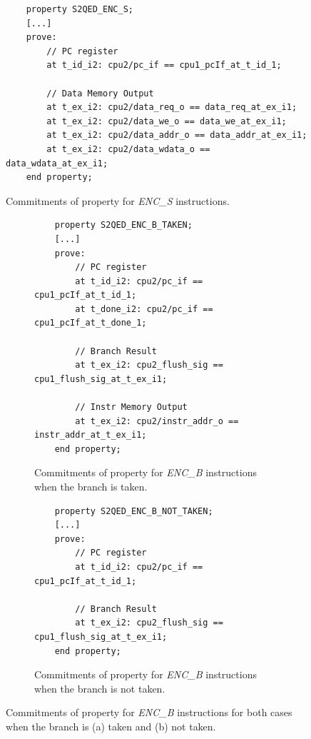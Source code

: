 \begin{figure}[htb!]
    \begin{lstlisting}
    property S2QED_ENC_S;
    [...]
    prove:
        // PC register
        at t_id_i2: cpu2/pc_if == cpu1_pcIf_at_t_id_1;
        
        // Data Memory Output
        at t_ex_i2: cpu2/data_req_o == data_req_at_ex_i1;
        at t_ex_i2: cpu2/data_we_o == data_we_at_ex_i1;
        at t_ex_i2: cpu2/data_addr_o == data_addr_at_ex_i1;
        at t_ex_i2: cpu2/data_wdata_o == data_wdata_at_ex_i1;
    end property;\end{lstlisting}
    \caption{Commitments of \SSQED{} property for \textit{ENC\_S} instructions.}
    \label{fig:ri5cy-enc-s-s2qed-ppt}
\end{figure}

\begin{figure}[htb!]
     \centering
     \begin{subfigure}[b]{\textwidth}
         \begin{lstlisting}
    property S2QED_ENC_B_TAKEN;
    [...]
    prove:
        // PC register
        at t_id_i2: cpu2/pc_if == cpu1_pcIf_at_t_id_1;
        at t_done_i2: cpu2/pc_if == cpu1_pcIf_at_t_done_1;
        
        // Branch Result
        at t_ex_i2: cpu2_flush_sig == cpu1_flush_sig_at_t_ex_i1;
        
        // Instr Memory Output
        at t_ex_i2: cpu2/instr_addr_o == instr_addr_at_t_ex_i1;
    end property;\end{lstlisting}
         \caption{Commitments of \SSQED{} property for \textit{ENC\_B} instructions when the branch is taken.}
         \label{fig:ri5cy-enc-b-s2qed-ppt-taken}
     \end{subfigure}
     \hfill
     \begin{subfigure}[b]{\textwidth}
         \begin{lstlisting}
    property S2QED_ENC_B_NOT_TAKEN;
    [...]
    prove:
        // PC register
        at t_id_i2: cpu2/pc_if == cpu1_pcIf_at_t_id_1;
        
        // Branch Result
        at t_ex_i2: cpu2_flush_sig == cpu1_flush_sig_at_t_ex_i1;
    end property;\end{lstlisting}
         \caption{Commitments of \SSQED{} property for \textit{ENC\_B} instructions when the branch is not taken.}
         \label{fig:ri5cy-enc-b-s2qed-ppt-not-taken}
     \end{subfigure}
        \caption{Commitments of \SSQED{} property for \textit{ENC\_B} instructions for both cases when the branch is (a) taken and (b) not taken.}
        \label{fig:ri5cy-enc-b-s2qed-ppt}
\end{figure}